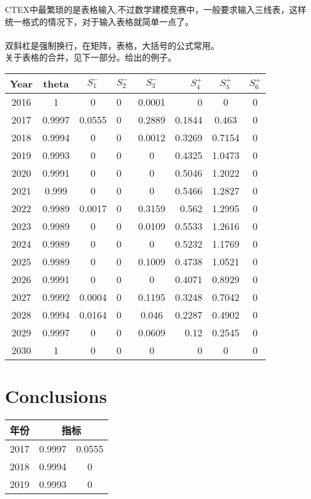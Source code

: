 \documentclass{mcmthesis}
\begin{document}
CTEX中最繁琐的是表格输入,不过数学建模竞赛中，一般要求输入三线表，这样统一格式的情况下，对于输入表格就简单一点了。\\
\\
双斜杠是强制换行，在矩阵，表格，大括号的公式常用。\\
关于表格的合并，见下一部分。给出的例子。
\begin{center}
\begin{tabular}{c|cclcrcc}
\hline
Year & theta & $S_1^-$ & $S_2^-$ & $S_3^-$ & $S_4^+$ & $S_5^+$ & $S_6^+$ \\%
\hline
2016 & 1      & 0      & 0 & 0.0001 & 0      & 0      & 0 \\
2017 & 0.9997 & 0.0555 & 0 & 0.2889 & 0.1844 & 0.463  & 0 \\
2018 & 0.9994 & 0      & 0 & 0.0012 & 0.3269 & 0.7154 & 0 \\
2019 & 0.9993 & 0      & 0 & 0      & 0.4325 & 1.0473 & 0 \\
2020 & 0.9991 & 0      & 0 & 0      & 0.5046 & 1.2022 & 0 \\
2021 & 0.999  & 0      & 0 & 0      & 0.5466 & 1.2827 & 0 \\
2022 & 0.9989 & 0.0017 & 0 & 0.3159 & 0.562  & 1.2995 & 0 \\
2023 & 0.9989 & 0      & 0 & 0.0109 & 0.5533 & 1.2616 & 0 \\
2024 & 0.9989 & 0      & 0 & 0      & 0.5232 & 1.1769 & 0 \\
2025 & 0.9989 & 0      & 0 & 0.1009 & 0.4738 & 1.0521 & 0 \\
2026 & 0.9991 & 0      & 0 & 0      & 0.4071 & 0.8929 & 0 \\
2027 & 0.9992 & 0.0004 & 0 & 0.1195 & 0.3248 & 0.7042 & 0 \\
2028 & 0.9994 & 0.0164 & 0 & 0.046  & 0.2287 & 0.4902 & 0 \\
2029 & 0.9997 & 0      & 0 & 0.0609 & 0.12   & 0.2545 & 0 \\
2030 & 1      & 0      & 0 & 0      & 0      & 0      & 0 \\
\hline
\end{tabular}
\end{center}

\section{Conclusions}


\begin{center}
\begin{tabular}{c|cc}
\hline
年份 & \multicolumn{2}{c}{指标}\\
\hline
2017 & 0.9997 & 0.0555 \\
2018 & 0.9994 & 0      \\
2019 & 0.9993 & 0      \\
\hline
\end{tabular}
\end{center}
\end{document}
